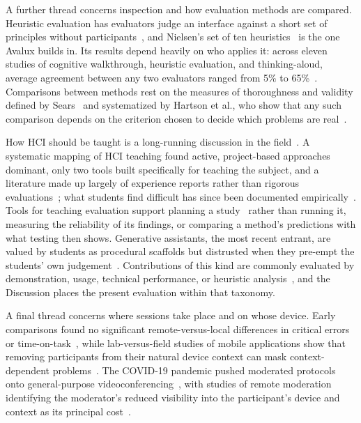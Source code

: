 A further thread concerns inspection and how evaluation methods are compared. Heuristic evaluation has evaluators judge an interface against a short set of principles without participants~\cite{nielsen1990heuristic}, and Nielsen's set of ten heuristics~\cite{nielsen1994enhancing} is the one Avalux builds in. Its results depend heavily on who applies it: across eleven studies of cognitive walkthrough, heuristic evaluation, and thinking-aloud, average agreement between any two evaluators ranged from 5\% to 65\%~\cite{hertzum2001evaluator}. Comparisons between methods rest on the measures of thoroughness and validity defined by Sears~\cite{sears1997heuristic} and systematized by Hartson et al., who show that any such comparison depends on the criterion chosen to decide which problems are real~\cite{hartson2001criteria}.

How HCI should be taught is a long-running discussion in the field~\cite{churchill2013teaching}. A systematic mapping of HCI teaching found active, project-based approaches dominant, only two tools built specifically for teaching the subject, and a literature made up largely of experience reports rather than rigorous evaluations~\cite{lima2019tools}; what students find difficult has since been documented empirically~\cite{oleson2020difficulties}. Tools for teaching evaluation support planning a study~\cite{schwind2023toolkit,rose2016plan} rather than running it, measuring the reliability of its findings, or comparing a method's predictions with what testing then shows. Generative assistants, the most recent entrant, are valued by students as procedural scaffolds but distrusted when they pre-empt the students' own judgement~\cite{aziz2026genai}. Contributions of this kind are commonly evaluated by demonstration, usage, technical performance, or heuristic analysis~\cite{ledo2018evaluation}, and the Discussion places the present evaluation within that taxonomy.

A final thread concerns where sessions take place and on whose device. Early comparisons found no significant remote-versus-local differences in critical errors or time-on-task~\cite{mcfadden2002remote,brush2004comparison}, while lab-versus-field studies of mobile applications show that removing participants from their natural device context can mask context-dependent problems~\cite{duh2006usability,kaikkonen2005usability}. The COVID-19 pandemic pushed moderated protocols onto general-purpose videoconferencing~\cite{simonliedtke2021remote,hill2021usability}, with studies of remote moderation identifying the moderator's reduced visibility into the participant's device and context as its principal cost~\cite{lobchuk2022remote}.

